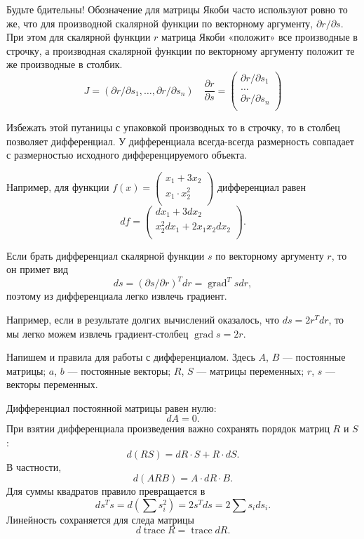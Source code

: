 \documentclass[12pt]{article}
\DeclareMathOperator{\grad}{grad}
\DeclareMathOperator{\trace}{trace}
\begin{document}
Будьте бдительны! 
Обозначение для матрицы Якоби часто используют ровно то же, что для производной скалярной функции по векторному аргументу, $\partial r/\partial s$. 
При этом для скалярной функции $r$ матрица Якоби «положит» все производные в строчку, а производная скалярной функции по векторному аргументу положит те же производные в столбик.
\[
J = (\partial r/\partial s_1, \dots, \partial r/\partial s_n) \quad \frac{\partial r}{\partial s} = \begin{pmatrix}
    \partial r/\partial s_1 \\
    \dots \\
    \partial r/\partial s_n \\
\end{pmatrix}
\]

Избежать этой путаницы с упаковкой производных то в строчку, то в столбец позволяет дифференциал. 
У дифференциала всегда-всегда размерность совпадает с размерностью исходного дифференцируемого объекта.

Например, для функции $f(x) = \begin{pmatrix}
    x_1 + 3x_2 \\
    x_1 \cdot x_2^2  \\
\end{pmatrix}$ дифференциал равен
\[
df = \begin{pmatrix}
    dx_1 +  3  dx_2 \\
    x_2^2 dx_1 +  2x_1 x_2 dx_2 \\
\end{pmatrix}.
\]

Если брать дифференциал скалярной функции $s$ по векторному аргументу $r$, то он примет вид
\[
ds = (\partial s/\partial r)^T dr = \grad^T s dr,
\]
поэтому из дифференциала легко извлечь градиент. 

Например, если в результате долгих вычислений оказалось, что $ds =  2r^T dr$,
то мы легко можем извлечь градиент-столбец $\grad s = 2r$.

Напишем и правила для работы с дифференциалом.
Здесь $A$, $B$ — постоянные матрицы; $a$, $b$ — постоянные векторы; $R$, $S$ — матрицы переменных; $r$, $s$ — векторы переменных.

Дифференциал постоянной матрицы равен нулю:
\[
dA = 0.
\]
При взятии дифференциала произведения важно  сохранять порядок матриц $R$ и $S$:
\[
d(RS) = dR \cdot S + R \cdot dS.
\]
В частности,
\[
d(ARB) = A \cdot dR \cdot B.
\]
Для суммы квадратов правило превращается в 
\[
d s^T s = d(\sum s_i^2) = 2s^T ds = 2 \sum s_i ds_i.
\]
Линейность сохраняется для следа матрицы
\[
d \trace R = \trace dR.
\]
\end{document}
